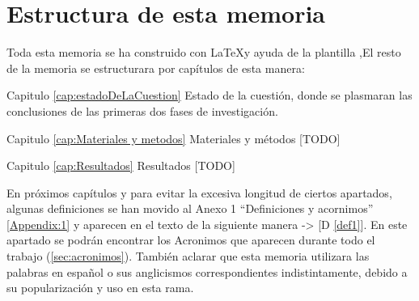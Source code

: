 \section{Estructura de esta memoria}

Toda esta memoria se ha construido con \LaTeX\space [\ref{latexDef}] y ayuda de la plantilla \texis,\space El resto de la memoria se estructurara por capítulos de esta manera:

Capitulo \ref{cap:estadoDeLaCuestion} Estado de la cuestión, donde se plasmaran las conclusiones de las primeras dos fases de investigación.

Capitulo \ref{cap:Materiales y metodos} Materiales y métodos [TODO]

Capitulo \ref{cap:Resultados} Resultados [TODO]

En próximos capítulos y para evitar la excesiva longitud de ciertos apartados, algunas definiciones se han movido al Anexo 1 ``Definiciones y acornimos'' \ref{Appendix:1} y aparecen en el texto de la siguiente manera -> [D \ref{def1}]. En este apartado se podrán encontrar los Acronimos que aparecen durante todo el trabajo (\ref{sec:acronimos}). También aclarar que esta memoria utilizara las palabras en español o sus anglicismos correspondientes indistintamente, debido a su popularización y uso en esta rama.
